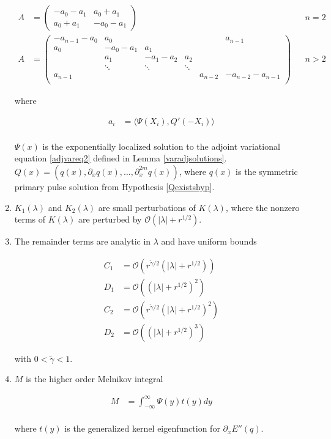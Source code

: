 \documentclass[thesis.tex]{subfiles}
\begin{document}
\begin{theorem}
\begin{enumerate}
\begin{align}\label{Asymm}
A &= \begin{pmatrix}
-a_0 -a_1 & a_0 + a_1 \\
a_0 + a_1 & -a_0 - a_1
\end{pmatrix} && n = 2 \\
A &= \begin{pmatrix}
-a_{n-1} - a_0 & a_0 & & &  & a_{n-1}\\
a_0 & -a_0 - a_1 &  a_1 \\
& a_1 & -a_1 - a_2 &  a_2 \\
& \ddots & \ddots & \ddots \\
a_{n-1} & & & & a_{n-2} & -a_{n-2} - a_{n-1} \\
\end{pmatrix} && n > 2 \nonumber
\end{align}

where

\begin{align*}
a_i &= \langle \Psi(X_i), Q'(-X_i) \rangle \\
\end{align*}

$\Psi(x)$ is the exponentially localized solution to the adjoint variational equation \eqref{adjvareq2} defined in Lemma \ref{varadjsolutions}. $Q(x) = (q(x), \partial_x q(x), \dots, \partial_x^{2m}q(x))$, where $q(x)$ is the symmetric primary pulse solution from Hypothesis \ref{Qexistshyp}.\\

\item $K_1(\lambda)$ and $K_2(\lambda)$ are small perturbations of $K(\lambda)$, where the nonzero terms of $K(\lambda)$ are perturbed by $\mathcal{O}(|\lambda| + r^{1/2})$.

\item The remainder terms are analytic in $\lambda$ and have uniform bounds

\begin{align*}
C_1 &= \mathcal{O}\left(r^{\tilde{\gamma}/2}(|\lambda| + r^{1/2})\right) \\
D_1 &= \mathcal{O}\left((|\lambda| + r^{1/2})^2\right) \\
C_2 &= \mathcal{O}\left(r^{\tilde{\gamma}/2}(|\lambda| + r^{1/2})^2\right) \\
D_2 &= \mathcal{O}\left((|\lambda| + r^{1/2})^3\right)
\end{align*}

with $0 < \tilde{\gamma} < 1$.

\item $M$ is the higher order Melnikov integral

\begin{align*}
M &= \int_{-\infty}^\infty \Psi(y) t(y) dy \\
\end{align*}

where $t(y)$ is the generalized kernel eigenfunction for $\partial_x E''(q)$.
\end{enumerate}
\end{theorem}
\end{document}
